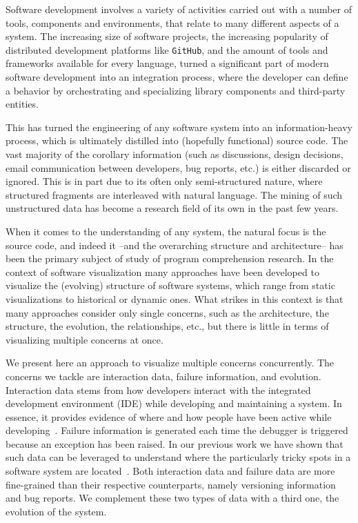 Software development involves a variety of activities carried out with a number of tools, components and environments, that relate to many different aspects of a system. The increasing size of software projects, the increasing popularity of distributed development platforms like \texttt{GitHub}, and the amount of tools and frameworks available for every language, turned a significant part of modern software development into an integration process, where the developer can define a behavior by orchestrating and specializing library components and third-party entities.

This has turned the engineering of any software system into an information-heavy process, which is ultimately distilled into (hopefully functional) source code. The vast majority of the corollary information (such as discussions, design decisions, email communication between developers, bug reports, etc.) is either discarded or ignored. This is in part due to its often only semi-structured nature, where structured fragments are interleaved with natural language. The mining of such unstructured data has become a research field of its own in the past few years.

When it comes to the understanding of any system, the natural focus is the source code, and indeed it --and the overarching structure and architecture-- has been the primary subject of study of program comprehension research. In the context of software visualization many approaches have been developed to visualize the (evolving) structure of software systems, which range from static visualizations to historical or dynamic ones. What strikes in this context is that many approaches consider only single concerns, such as the architecture, the structure, the evolution, the relationships, etc., but there is little in terms of visualizing multiple concerns at once.

We present here an approach to visualize multiple concerns concurrently. The concerns we tackle are interaction data, failure information, and evolution. Interaction data stems from how developers interact with the integrated development environment (IDE) while developing and maintaining a system. In essence, it provides evidence of where and how people have been active while developing~\cite{Mine2015b}. Failure information is generated each time the debugger is triggered because an exception has been raised. In our previous work we have shown that such data can be leveraged to understand where the particularly tricky spots in a software system are located~\cite{DalS2015a}. Both interaction data and failure data are more fine-grained than their respective counterparts, namely versioning information and bug reports. We complement these two types of data with a third one, the evolution of the system.

